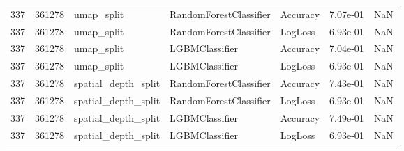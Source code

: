 \begin{tabular}{rrlllrr}
337 & 361278 & umap\_split & RandomForestClassifier & Accuracy & 7.07e-01 & NaN \\
337 & 361278 & umap\_split & RandomForestClassifier & LogLoss & 6.93e-01 & NaN \\
337 & 361278 & umap\_split & LGBMClassifier & Accuracy & 7.04e-01 & NaN \\
337 & 361278 & umap\_split & LGBMClassifier & LogLoss & 6.93e-01 & NaN \\
337 & 361278 & spatial\_depth\_split & RandomForestClassifier & Accuracy & 7.43e-01 & NaN \\
337 & 361278 & spatial\_depth\_split & RandomForestClassifier & LogLoss & 6.93e-01 & NaN \\
337 & 361278 & spatial\_depth\_split & LGBMClassifier & Accuracy & 7.49e-01 & NaN \\
337 & 361278 & spatial\_depth\_split & LGBMClassifier & LogLoss & 6.93e-01 & NaN \\
\bottomrule
\end{tabular}
